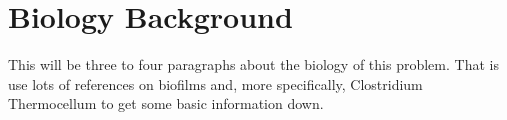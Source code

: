 \section{Biology Background}

This will be three to four paragraphs about the biology of this problem. That is use lots of references on biofilms and, more specifically, Clostridium Thermocellum to get some basic information down.
